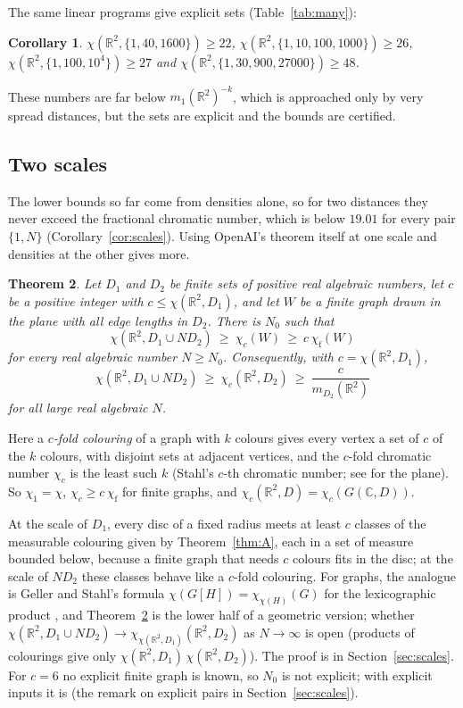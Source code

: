 \documentclass[11pt,a4paper]{amsart}
\newtheorem{theorem}{Theorem}
\newtheorem{corollary}[theorem]{Corollary}
\theoremstyle{definition}
\theoremstyle{remark}
\newcommand{\C}{\mathbb{C}}
\newcommand{\R}{\mathbb{R}}
\newcommand{\chif}{\chi_{\mathrm f}}
\begin{document}
The same linear programs give explicit sets (Table~\ref{tab:many}):

\begin{corollary}\label{cor:explicit}
$\chi(\R^2,\{1,40,1600\})\ge22$, $\chi(\R^2,\{1,10,100,1000\})\ge26$, $\chi(\R^2,\{1,100,10^4\})\ge27$ and
$\chi(\R^2,\{1,30,900,27000\})\ge48$.
\end{corollary}

These numbers are far below $m_1(\R^2)^{-k}$, which is approached only by very spread distances, but the sets are
explicit and the bounds are certified.

\subsection*{Two scales}

The lower bounds so far come from densities alone, so for two distances they never exceed the fractional chromatic
number, which is below $19.01$ for every pair $\{1,N\}$ (Corollary~\ref{cor:scales}). Using OpenAI's theorem itself
at one scale and densities at the other gives more.

\begin{theorem}\label{thm:C}
Let $D_1$ and $D_2$ be finite sets of positive real algebraic numbers, let $c$ be a positive integer with
$c\le\chi(\R^2,D_1)$, and let $W$ be a finite graph drawn in the plane with all edge lengths in $D_2$. There is $N_0$
such that
\[
\chi(\R^2,D_1\cup ND_2)\ \ge\ \chi_c(W)\ \ge\ c\,\chif(W)
\]
for every real algebraic number $N\ge N_0$. Consequently, with $c=\chi(\R^2,D_1)$,
\[
\chi(\R^2,D_1\cup ND_2)\ \ge\ \chi_c(\R^2,D_2)\ \ge\ \frac{c}{m_{D_2}(\R^2)}
\]
for all large real algebraic $N$.
\end{theorem}

Here a \emph{$c$-fold colouring} of a graph with $k$ colours gives every vertex a set of $c$ of the $k$ colours,
with disjoint sets at adjacent vertices, and the $c$-fold chromatic number $\chi_c$ is the least such $k$ (Stahl's
$c$-th chromatic number; see \cite{GJSW} for the plane). So $\chi_1=\chi$, $\chi_c\ge c\,\chif$ for finite graphs,
and $\chi_c(\R^2,D)=\chi_c(G(\C,D))$.

At the scale of $D_1$, every disc of a fixed radius meets at least $c$ classes of the measurable colouring given
by Theorem~\ref{thm:A}, each in a set of measure bounded below, because a finite graph that needs $c$ colours fits in
the disc; at the scale of $ND_2$ these classes behave like a $c$-fold colouring. For graphs, the analogue is Geller
and Stahl's formula $\chi(G[H])=\chi_{\chi(H)}(G)$ for the lexicographic product \cite{GS}, and Theorem~\ref{thm:C}
is the lower half of a geometric version; whether $\chi(\R^2,D_1\cup ND_2)\to\chi_{\chi(\R^2,D_1)}(\R^2,D_2)$ as
$N\to\infty$ is open (products of colourings give only $\chi(\R^2,D_1)\,\chi(\R^2,D_2)$). The proof is in
Section~\ref{sec:scales}. For $c=6$ no explicit finite graph is known, so $N_0$ is not explicit; with explicit inputs
it is (the remark on explicit pairs in Section~\ref{sec:scales}).
\end{document}
